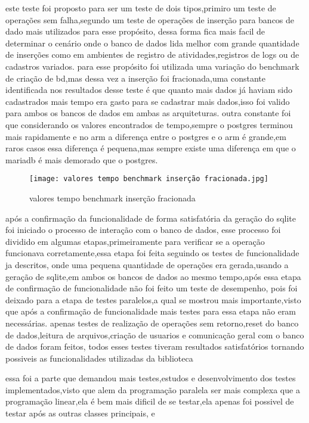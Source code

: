 \documentclass[
	12pt,				%
	openright,			%
	oneside,			%
	a4paper,			%
	english,			%
	french,				%
	spanish,			%
	brazil,				%
	]{abntex2}
\begin{document}
este teste foi proposto para ser um teste de dois tipos,primiro um teste de operações sem falha,segundo um teste de operações de inserção para bancos de dado mais utilizados para esse propósito,
dessa forma fica mais facil de determinar o cenário onde o banco de dados lida melhor com grande quantidade de inserções como em ambientes de registro de atividades,registros de logs ou de cadastros variados.
para esse propósito foi utilizada uma variação do benchmark de criação de bd,mas dessa vez a inserção foi fracionada,uma constante identificada nos resultados desse teste é que quanto mais dados já haviam sido cadastrados mais tempo era gasto para se cadastrar mais dados,isso foi valido para ambos os bancos de dados em ambas as arquiteturas.
outra constante foi que considerando os valores encontrados de tempo,sempre o postgres terminou mais rapidamente e no arm a diferença entre o postgres e o arm é grande,em raros casos essa diferença é pequena,mas sempre existe uma diferença em que o mariadb é mais demorado que o postgres.
\begin{figure}
  \texttt{[image: valores tempo benchmark inserção fracionada.jpg]}
  \caption{valores tempo benchmark inserção fracionada}
  \label{fig:resultados insercao fracionada}
\end{figure}

após a confirmação da funcionalidade de forma satisfatória da geração do sqlite foi iniciado o processo de interação com o banco de dados,
esse processo foi dividido em algumas etapas,primeiramente para verificar se a operação funcionava corretamente,essa etapa foi feita seguindo os testes de funcionalidade ja descritos,
onde uma pequena quantidade de operações era gerada,usando a geração de sqlite,em ambos os bancos de dados ao mesmo tempo,após essa etapa de confirmação de funcionalidade não foi feito um teste de desempenho,
pois foi deixado para a etapa de testes paralelos,a qual se mostrou mais importante,visto que após a confirmação de funcionalidade mais testes para essa etapa não eram necessárias.
apenas testes de realização de operações sem retorno,reset do banco de dados,leitura de arquivos,criação de usuarios e comunicação geral com o banco de dados foram feitos,
todos esses testes tiveram resultados satisfatórios tornando possiveis as funcionalidades utilizadas da biblioteca 

essa foi a parte que demandou mais testes,estudos e desenvolvimento dos testes implementados,visto que alem da programação paralela ser mais complexa que a programação linear,ela é bem mais dificil de se testar,ela apenas foi possivel de testar após as outras classes principais, e 
\end{document}
